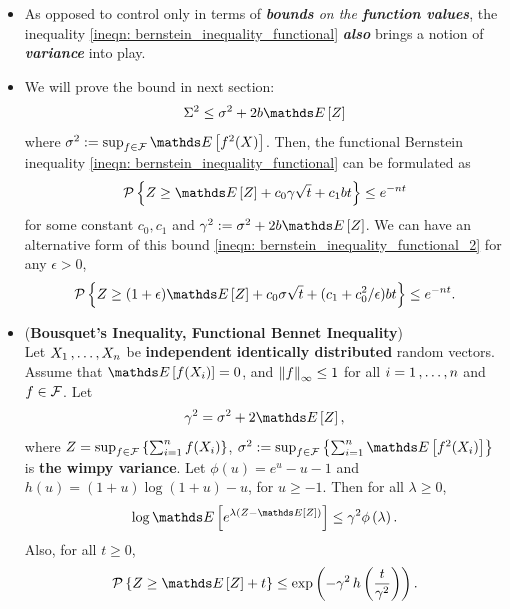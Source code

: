 \documentclass[11pt]{article}
\begin{document}
\begin{itemize}
\item \begin{remark}
As opposed to control only in terms of \emph{\textbf{bounds} on the \textbf{function values}}, the inequality \eqref{ineqn: bernstein_inequality_functional} \textbf{\emph{also}} brings a notion of \emph{\textbf{variance}} into play. 
\end{remark}

\item \begin{remark}
We will prove the bound in next section:
\begin{align*}
\Sigma^2 \le \sigma^2 + 2b\E{}{Z}
\end{align*} where $\sigma^2 := \sup_{f\in \cF}\E{}{f^2(X)}$. Then, the functional Bernstein inequality \eqref{ineqn: bernstein_inequality_functional} can be formulated as
\begin{align}
\cP\set{Z \ge \E{}{Z} +c_0 \gamma \sqrt{t} + c_1 bt} \le  e^{- n t}  \label{ineqn: bernstein_inequality_functional_2}
\end{align} for some constant $c_0, c_1$ and $\gamma^2 := \sigma^2 + 2b\E{}{Z}$. We can have an alternative form of this bound \eqref{ineqn: bernstein_inequality_functional_2} for any $\epsilon > 0$, 
\begin{align}
\cP\set{Z \ge (1+\epsilon)\E{}{Z} +c_0 \sigma \sqrt{t} + (c_1 + c_0^2/\epsilon)bt} \le  e^{- n t}.  \label{ineqn: bernstein_inequality_functional_3}
\end{align}
\end{remark}

\item \begin{theorem} (\textbf{Bousquet's Inequality, Functional Bennet Inequality})  \citep{boucheron2013concentration}\\
Let $X_1 \,{,}\ldots{,}\, X_n$ be \textbf{independent} \textbf{identically distributed} random vectors. Assume that $\E{}{f(X_i)} = 0$, and $\left\|f\right\|_{\infty} \le 1$ for all $i = 1 \,{,}\ldots{,}\, n$ and $f \in {\mathcal F}$.
Let
\begin{align*}
\gamma^2= \sigma^2 + 2\E{}{Z},
\end{align*} where $Z = \sup_{f \in {\mathcal F}}\left\{\sum_{i=1}^n f(X_i)\right\}$, $\sigma^2 := \sup_{f\in \cF}\set{\sum_{i=1}^n\E{}{f^2(X_i)}}$ is \textbf{the wimpy variance}. Let $\phi(u) = e^u - u - 1$ and $h(u) = (1 + u) \log(1 + u) - u$, for $u \ge -1$. Then for all $\lambda \ge 0$,
\begin{align*}
\log \E{}{e^{\lambda\paren{Z - \E{}{Z}}}} \le \gamma^2 \phi\paren{\lambda}.
\end{align*}
Also, for all $t \ge 0$,
\begin{align}
\cP\set{Z \ge \E{}{Z} + t} \le \exp\paren{- \gamma^2 \, h\paren{\frac{t}{\gamma^2}}}. \label{ineqn: bousquet_inequality_bennet_functional}
\end{align}
\end{theorem}
\end{itemize}
\end{document}
